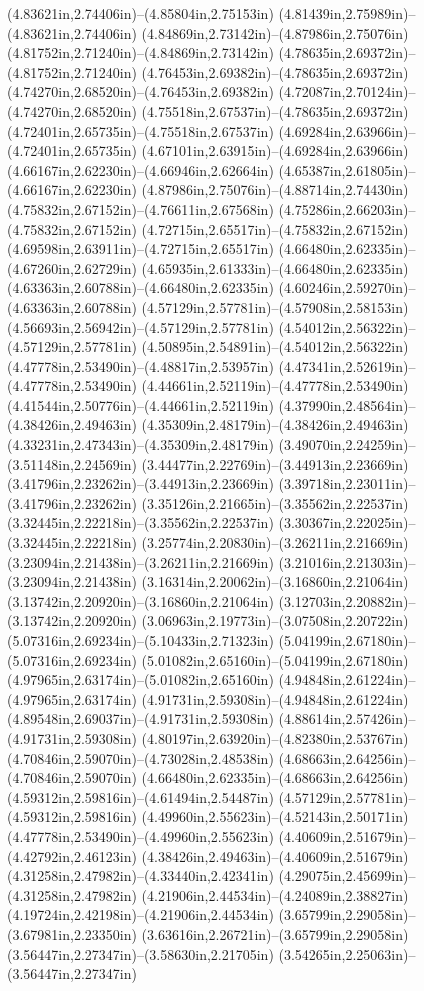 (4.83621in,2.74406in)--(4.85804in,2.75153in) (4.81439in,2.75989in)--(4.83621in,2.74406in) (4.84869in,2.73142in)--(4.87986in,2.75076in) (4.81752in,2.71240in)--(4.84869in,2.73142in) (4.78635in,2.69372in)--(4.81752in,2.71240in) (4.76453in,2.69382in)--(4.78635in,2.69372in) (4.74270in,2.68520in)--(4.76453in,2.69382in) (4.72087in,2.70124in)--(4.74270in,2.68520in) (4.75518in,2.67537in)--(4.78635in,2.69372in) (4.72401in,2.65735in)--(4.75518in,2.67537in) (4.69284in,2.63966in)--(4.72401in,2.65735in) (4.67101in,2.63915in)--(4.69284in,2.63966in) (4.66167in,2.62230in)--(4.66946in,2.62664in) (4.65387in,2.61805in)--(4.66167in,2.62230in) (4.87986in,2.75076in)--(4.88714in,2.74430in) (4.75832in,2.67152in)--(4.76611in,2.67568in) (4.75286in,2.66203in)--(4.75832in,2.67152in) (4.72715in,2.65517in)--(4.75832in,2.67152in) (4.69598in,2.63911in)--(4.72715in,2.65517in) (4.66480in,2.62335in)--(4.67260in,2.62729in) (4.65935in,2.61333in)--(4.66480in,2.62335in) (4.63363in,2.60788in)--(4.66480in,2.62335in) (4.60246in,2.59270in)--(4.63363in,2.60788in) (4.57129in,2.57781in)--(4.57908in,2.58153in) (4.56693in,2.56942in)--(4.57129in,2.57781in) (4.54012in,2.56322in)--(4.57129in,2.57781in) (4.50895in,2.54891in)--(4.54012in,2.56322in) (4.47778in,2.53490in)--(4.48817in,2.53957in) (4.47341in,2.52619in)--(4.47778in,2.53490in) (4.44661in,2.52119in)--(4.47778in,2.53490in) (4.41544in,2.50776in)--(4.44661in,2.52119in) (4.37990in,2.48564in)--(4.38426in,2.49463in) (4.35309in,2.48179in)--(4.38426in,2.49463in) (4.33231in,2.47343in)--(4.35309in,2.48179in) (3.49070in,2.24259in)--(3.51148in,2.24569in) (3.44477in,2.22769in)--(3.44913in,2.23669in) (3.41796in,2.23262in)--(3.44913in,2.23669in) (3.39718in,2.23011in)--(3.41796in,2.23262in) (3.35126in,2.21665in)--(3.35562in,2.22537in) (3.32445in,2.22218in)--(3.35562in,2.22537in) (3.30367in,2.22025in)--(3.32445in,2.22218in) (3.25774in,2.20830in)--(3.26211in,2.21669in) (3.23094in,2.21438in)--(3.26211in,2.21669in) (3.21016in,2.21303in)--(3.23094in,2.21438in) (3.16314in,2.20062in)--(3.16860in,2.21064in) (3.13742in,2.20920in)--(3.16860in,2.21064in) (3.12703in,2.20882in)--(3.13742in,2.20920in) (3.06963in,2.19773in)--(3.07508in,2.20722in) (5.07316in,2.69234in)--(5.10433in,2.71323in) (5.04199in,2.67180in)--(5.07316in,2.69234in) (5.01082in,2.65160in)--(5.04199in,2.67180in) (4.97965in,2.63174in)--(5.01082in,2.65160in) (4.94848in,2.61224in)--(4.97965in,2.63174in) (4.91731in,2.59308in)--(4.94848in,2.61224in) (4.89548in,2.69037in)--(4.91731in,2.59308in) (4.88614in,2.57426in)--(4.91731in,2.59308in) (4.80197in,2.63920in)--(4.82380in,2.53767in) (4.70846in,2.59070in)--(4.73028in,2.48538in) (4.68663in,2.64256in)--(4.70846in,2.59070in) (4.66480in,2.62335in)--(4.68663in,2.64256in) (4.59312in,2.59816in)--(4.61494in,2.54487in) (4.57129in,2.57781in)--(4.59312in,2.59816in) (4.49960in,2.55623in)--(4.52143in,2.50171in) (4.47778in,2.53490in)--(4.49960in,2.55623in) (4.40609in,2.51679in)--(4.42792in,2.46123in) (4.38426in,2.49463in)--(4.40609in,2.51679in) (4.31258in,2.47982in)--(4.33440in,2.42341in) (4.29075in,2.45699in)--(4.31258in,2.47982in) (4.21906in,2.44534in)--(4.24089in,2.38827in) (4.19724in,2.42198in)--(4.21906in,2.44534in) (3.65799in,2.29058in)--(3.67981in,2.23350in) (3.63616in,2.26721in)--(3.65799in,2.29058in) (3.56447in,2.27347in)--(3.58630in,2.21705in) (3.54265in,2.25063in)--(3.56447in,2.27347in) 